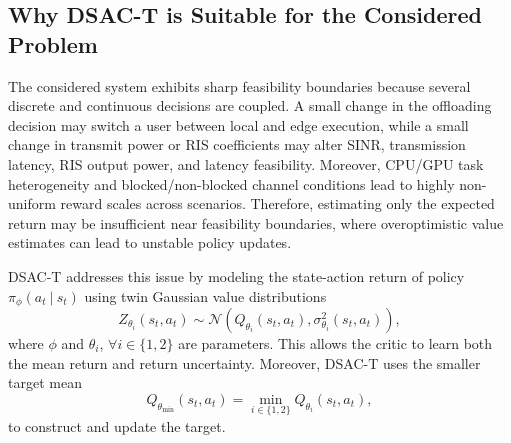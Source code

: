 \documentclass[conference]{IEEEtran}
\begin{document}
\subsection{Why DSAC-T is Suitable for the Considered Problem}

The considered system exhibits sharp feasibility boundaries because several 
discrete and continuous decisions are coupled. A small change in the offloading 
decision may switch a user between local and edge execution, while a small change 
in transmit power or RIS coefficients may alter SINR, transmission latency, RIS 
output power, and latency feasibility. Moreover, CPU/GPU task heterogeneity and 
blocked/non-blocked channel conditions lead to highly non-uniform reward scales 
 across scenarios. Therefore, estimating only the expected return may be insufficient near 
feasibility boundaries, where overoptimistic value estimates can lead to unstable 
policy updates.



DSAC-T addresses this issue by modeling the state-action return of policy $\pi_\phi(a_t~|~s_t)$ using twin Gaussian value distributions
\begin{equation}
Z_{\theta_i}(s_t,a_t)\sim
\mathcal{N}\!\left(Q_{\theta_i}(s_t,a_t),\sigma_{\theta_i}^2(s_t,a_t)\right),
\label{eq:twin}
\end{equation}
where $\phi$ and $\theta_i$, $\forall i\in\{1,2\}$ are parameters.
This allows the critic to learn both the mean return and return uncertainty. Moreover, DSAC-T uses the smaller target mean
\begin{equation}
Q_{\theta_{\min}}(s_{t},a_{t})
=
\min_{i\in\{1,2\}}
Q_{\theta_i}(s_{t},a_{t}),
\label{eq:q_target_min}
\end{equation}
to construct and update the target. 
\end{document}
